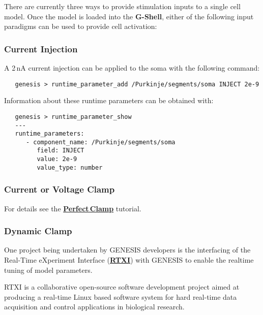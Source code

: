 \documentclass[12pt]{article}
\begin{document}
There are currently three ways to provide stimulation inputs to a single cell model. Once the model is loaded into the {\bf G-Shell}, either of the following input paradigms can be used to provide cell activation:

\subsubsection*{Current Injection}

A 2\,nA current injection can be applied to the soma with the following command:
\begin{verbatim}
   genesis > runtime_parameter_add /Purkinje/segments/soma INJECT 2e-9
\end{verbatim}

Information about these runtime parameters can be obtained with:
\begin{verbatim}
   genesis > runtime_parameter_show
   ---
   runtime_parameters:
      - component_name: /Purkinje/segments/soma
         field: INJECT
         value: 2e-9
         value_type: number
\end{verbatim}

\subsubsection*{Current or Voltage Clamp}

For details see the \href{../pclamp/pclamp.tex}{\bf Perfect\,Clamp} tutorial.

\subsubsection*{Dynamic Clamp}

One project being undertaken by GENESIS developers is the interfacing of the Real-Time eXperiment Interface (\href{http://www.rtxi.org/}{\bf RTXI}) with GENESIS to enable the realtime tuning of model parameters.

RTXI is a collaborative open-source software development project aimed at producing a real-time Linux based software system for hard real-time data acquisition and control applications in biological research. \\
\end{document}
